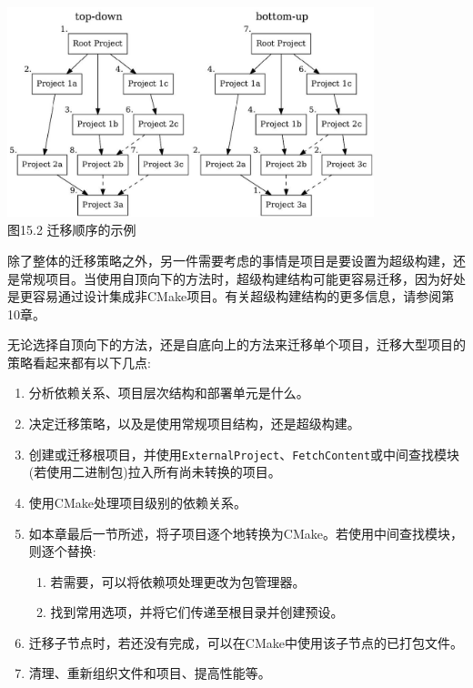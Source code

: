 \begin{center}
\includegraphics[width=0.8\textwidth]{content/3/chapter15/images/2.jpg}\\
图15.2 迁移顺序的示例
\end{center}

除了整体的迁移策略之外，另一件需要考虑的事情是项目是要设置为超级构建，还是常规项目。当使用自顶向下的方法时，超级构建结构可能更容易迁移，因为好处是更容易通过设计集成非CMake项目。有关超级构建结构的更多信息，请参阅第10章。

无论选择自顶向下的方法，还是自底向上的方法来迁移单个项目，迁移大型项目的策略看起来都有以下几点:

\begin{enumerate}
\item 
分析依赖关系、项目层次结构和部署单元是什么。

\item 
决定迁移策略，以及是使用常规项目结构，还是超级构建。

\item 
创建或迁移根项目，并使用\texttt{ExternalProject}、\texttt{FetchContent}或中间查找模块(若使用二进制包)拉入所有尚未转换的项目。

\item
使用CMake处理项目级别的依赖关系。

\item
如本章最后一节所述，将子项目逐个地转换为CMake。若使用中间查找模块，则逐个替换:

\begin{enumerate}[label=\roman*]
\item
若需要，可以将依赖项处理更改为包管理器。

\item
找到常用选项，并将它们传递至根目录并创建预设。
\end{enumerate}

\item
迁移子节点时，若还没有完成，可以在CMake中使用该子节点的已打包文件。

\item
清理、重新组织文件和项目、提高性能等。
\end{enumerate}

